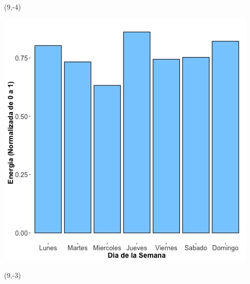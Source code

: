 \documentclass{article}\usepackage[]{graphicx}\usepackage[]{color}
\newenvironment{knitrout}{}{} %
\begin{document}
 \begin{textblock}{1}(9,-4)
\begin{minipage}{20em}
\begingroup

\endgroup
\end{minipage}
\end{textblock}


\begin{knitrout}
\color{fgcolor}
\includegraphics[scale=0.65]{figure/A18_day_of_week_plot} 
\end{knitrout}


 \begin{textblock}{1}(9,-3)
\begin{minipage}{20em}
\begingroup

\endgroup
\end{minipage}
\end{textblock}
\end{document}
